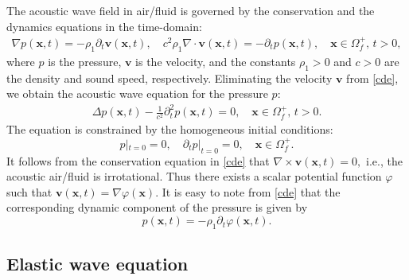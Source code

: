 \documentclass[final,leqno]{siamltex}
\begin{document}
The acoustic wave field in air/fluid is governed by the conservation and the
dynamics equations in the  time-domain:
\begin{align}\label{cde}
\nabla p (\boldsymbol x, t)= -\rho_1 \partial_t \boldsymbol v  (\boldsymbol
x, t),\quad  c^2 \rho_1 \nabla \cdot \boldsymbol v (\boldsymbol x, t) =
-\partial_t p (\boldsymbol x, t), \quad \boldsymbol x \in \Omega^{+}_f,\, t>0,
\end{align}
where $p$ is the pressure, $\boldsymbol v$ is the velocity, and the
constants $\rho_1 >0 $ and $c>0$ are the density  and sound speed,
respectively. Eliminating the velocity  $\boldsymbol v$ from
\eqref{cde}, we obtain the acoustic wave equation for the pressure $p$:
\begin{align*}
 \Delta p (\boldsymbol x, t)- \frac{1}{c^2} \partial_t^2 p (\boldsymbol x, t)=0,
\quad  \boldsymbol x \in \Omega^{+}_f,\, t>0.
\end{align*}
The equation is constrained by the homogeneous initial conditions:
\[
p|_{t=0}=0, \quad \partial_t  p|_{t=0}=0, \quad \boldsymbol x\in\Omega^{+}_f.
\]
It follows from the conservation equation in \eqref{cde} that $\nabla \times
\boldsymbol v (\boldsymbol x, t)=0,$ i.e., the acoustic air/fluid
is irrotational. Thus there exists a scalar potential function $\varphi$ such
that $\boldsymbol v (\boldsymbol x, t) = \nabla \varphi (\boldsymbol x).$ It is
easy to note from \eqref{cde} that the corresponding dynamic component of
the pressure is given by
 \[
  p (\boldsymbol x, t) =- \rho_1 \partial_t \varphi (\boldsymbol x, t).
\]

\subsection{Elastic wave equation}
\end{document}
